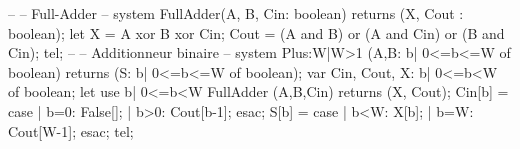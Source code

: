 --
--  Full-Adder
-- 
system FullAdder(A, B, Cin: boolean)
returns (X, Cout : boolean);
let
  X = A xor B xor Cin;
  Cout = (A and B) or (A and Cin) or (B and Cin);
tel;
--
--  Additionneur binaire
--
system Plus:{W|W>1} (A,B: {b| 0<=b<=W} of boolean)
returns (S: {b| 0<=b<=W} of boolean);
var Cin, Cout, X: {b| 0<=b<W} of boolean;
let
   use {b| 0<=b<W} FullAdder (A,B,Cin) returns (X, Cout);
   Cin[b] = case
           {| b=0}: False[];
           {| b>0}: Cout[b-1];
         esac;
   S[b] = case
           {| b<W}: X[b];
           {| b=W}: Cout[W-1];
          esac;
tel;
